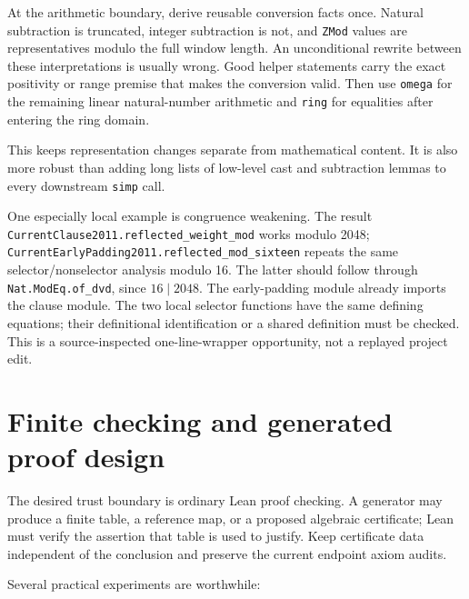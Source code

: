 \documentclass[11pt,letterpaper]{article}
\newcommand{\code}[1]{\nolinkurl{#1}}
\begin{document}
At the arithmetic boundary, derive reusable conversion facts once. Natural
subtraction is truncated, integer subtraction is not, and \code{ZMod} values
are representatives modulo the full window length. An unconditional rewrite
between these interpretations is usually wrong. Good helper statements carry
the exact positivity or range premise that makes the conversion valid.
Then use \code{omega} for the remaining linear natural-number arithmetic and
\code{ring} for equalities after entering the ring domain.

This keeps representation changes separate from mathematical content. It is
also more robust than adding long lists of low-level cast and subtraction
lemmas to every downstream \code{simp} call.

One especially local example is congruence weakening. The result
\code{CurrentClause2011.reflected_weight_mod} works modulo 2048;
\code{CurrentEarlyPadding2011.reflected_mod_sixteen} repeats the same
selector/nonselector analysis modulo 16. The latter should follow through
\code{Nat.ModEq.of_dvd}, since $16\mid2048$. The early-padding module already
imports the clause module. The two local selector functions have the same
defining equations; their definitional identification or a shared definition
must be checked. This is a source-inspected one-line-wrapper opportunity,
not a replayed project edit.

\section{Finite checking and generated proof design}

The desired trust boundary is ordinary Lean proof checking. A generator may
produce a finite table, a reference map, or a proposed algebraic certificate;
Lean must verify the assertion that table is used to justify. Keep certificate
data independent of the conclusion and preserve the current endpoint axiom
audits.

Several practical experiments are worthwhile:
\end{document}
